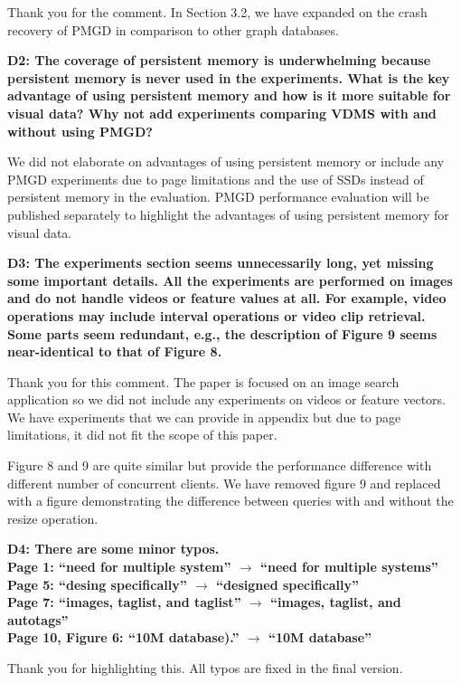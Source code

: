 \documentclass[11pt]{proposalnsf}
\begin{document}
Thank you for the comment.
In Section 3.2, we have expanded on the crash recovery of PMGD in
comparison to other graph databases.

\bigskip
\noindent %
\textbf{
D2: The coverage of persistent memory is underwhelming because persistent memory
is never used in the experiments.
What is the key advantage of using persistent memory and how is it
more suitable for visual data? Why not add experiments comparing VDMS with
and without using PMGD?
}\bigskip

We did not elaborate on advantages of using persistent memory or include
any PMGD experiments due to page limitations and the use of SSDs
instead of persistent memory in the evaluation.
PMGD performance evaluation will be published separately to highlight
the advantages of using persistent memory for visual data.

\bigskip
\noindent %
\textbf{
D3: The experiments section seems unnecessarily long, yet missing some important
details. All the experiments are performed on images and do not handle videos or feature
values at all. For example, video operations may include interval operations or video
clip retrieval. Some parts seem redundant, e.g., the description of Figure 9 seems
near-identical to that of Figure 8.
}\bigskip

Thank you for this comment.
The paper is focused on an image search application so we did not include any
experiments on videos or feature vectors. We have experiments that we can provide in
appendix but due to page limitations, it did not fit the scope of this paper.

Figure 8 and 9 are quite similar but provide the performance difference with different
number of concurrent clients. We have removed figure 9 and replaced with a figure
demonstrating the difference between queries with and without the resize operation.

\bigskip
\noindent %
\textbf{
D4: There are some minor typos.\\
Page 1: “need for multiple system” $\rightarrow$  “need for multiple systems”\\
Page 5: “desing specifically” $\rightarrow$ “designed specifically”\\
Page 7: “images, taglist, and taglist” $\rightarrow$ “images, taglist, and autotags”\\
Page 10, Figure 6: “10M database).” $\rightarrow$ “10M database”
}\bigskip

Thank you for highlighting this. All typos are fixed in the final version.

\end{document}

